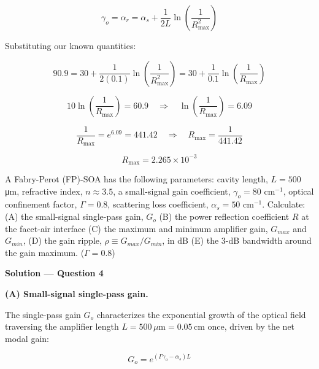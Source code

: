 \begin{equation*}
  \gamma_o = \alpha_r = \alpha_s + \frac{1}{2L} \ln\left( \frac{1}{R_{\text{max}}^2} \right)
\end{equation*}

Substituting our known quantities:

\begin{equation*}
  90.9 = 30 + \frac{1}{2(0.1)} \ln\left( \frac{1}{R_{\text{max}}^2} \right) = 30 + \frac{1}{0.1} \ln\left( \frac{1}{R_{\text{max}}} \right)
\end{equation*}

\begin{equation*}
  10 \ln\left( \frac{1}{R_{\text{max}}} \right) = 60.9 \quad\Longrightarrow\quad \ln\left( \frac{1}{R_{\text{max}}} \right) = 6.09
\end{equation*}

\begin{equation*}
  \frac{1}{R_{\text{max}}} = e^{6.09} = 441.42 \quad\Longrightarrow\quad R_{\text{max}} = \frac{1}{441.42}
\end{equation*}

\begin{equation*}
  \boxed{R_{\text{max}} = 2.265 \times 10^{-3}}
\end{equation*}

\begin{question}[Question 4]
A Fabry-Perot (FP)-SOA has the following parameters: cavity length, $L = 500$ \si{\micro\meter}, refractive index, $n \approx 3.5$, a small-signal gain coefficient, $\gamma_o = 80$ cm$^{-1}$, optical confinement factor, $\Gamma = 0.8$, scattering loss coefficient, $\alpha_s = 50$ cm$^{-1}$. Calculate: (A) the small-signal single-pass gain, $G_o$ (B) the power reflection coefficient $R$ at the facet-air interface (C) the maximum and minimum amplifier gain, $G_{max}$ and $G_{min}$, (D) the gain ripple, $\rho \equiv G_{max}/G_{min}$, in dB (E) the 3-dB bandwidth around the gain maximum. ($\Gamma = 0.8$)
\end{question}

\textbf{\large Solution --- Question 4}

\textbf{(A) Small-signal single-pass gain.}

The single-pass gain $G_o$ characterizes the exponential growth of the optical field traversing the amplifier length $L = 500\,\mu\text{m} = 0.05\,\text{cm}$ once, driven by the net modal gain:

\begin{equation*}
  G_o = e^{(\Gamma \gamma_o - \alpha_s)L}
\end{equation*}

